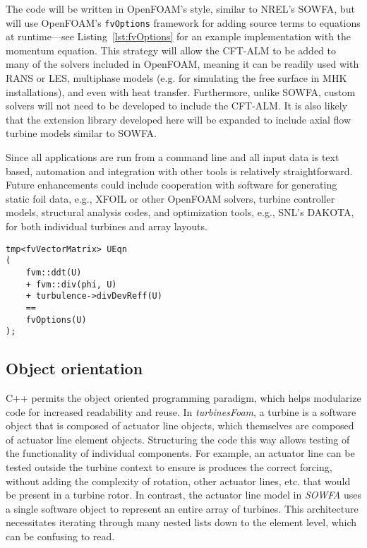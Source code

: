 The code will be written in OpenFOAM's style, similar to NREL's SOWFA, but will
use OpenFOAM's \texttt{fvOptions} framework for adding source terms to equations
at runtime---see Listing~\ref{lst:fvOptions} for an example implementation with
the momentum equation. This strategy will allow the CFT-ALM to be added to many
of the solvers included in OpenFOAM, meaning it can be readily used with RANS or
LES, multiphase models (e.g. for simulating the free surface in MHK
installations), and even with heat transfer. Furthermore, unlike SOWFA, custom
solvers will not need to be developed to include the CFT-ALM. It is also likely
that the extension library developed here will be expanded to include axial flow
turbine models similar to SOWFA.

Since all applications are run from a command line and all input data is text
based, automation and integration with other tools is relatively
straightforward. Future enhancements could include cooperation with software for
generating static foil data, e.g., XFOIL or other OpenFOAM solvers, turbine
controller models, structural analysis codes, and optimization tools, e.g.,
SNL's DAKOTA, for both individual turbines and array layouts.

\begin{lstlisting}[float,caption=Adding source terms to the momentum equation in OpenFOAM.,label=lst:fvOptions]
tmp<fvVectorMatrix> UEqn
(
    fvm::ddt(U)
    + fvm::div(phi, U)
    + turbulence->divDevReff(U)
    ==
    fvOptions(U)
);
\end{lstlisting}


\subsection{Object orientation}

C++ permits the object oriented programming paradigm, which helps modularize
code for increased readability and reuse. In \textit{turbinesFoam}, a turbine is
a software object that is composed of actuator line objects, which themselves
are composed of actuator line element objects. Structuring the code this way
allows testing of the functionality of individual components. For example, an
actuator line can be tested outside the turbine context to ensure is produces
the correct forcing, without adding the complexity of rotation, other actuator
lines, etc. that would be present in a turbine rotor. In contrast, the actuator
line model in \textit{SOWFA} uses a single software object to represent an
entire array of turbines. This architecture necessitates iterating through many
nested lists down to the element level, which can be confusing to read.


